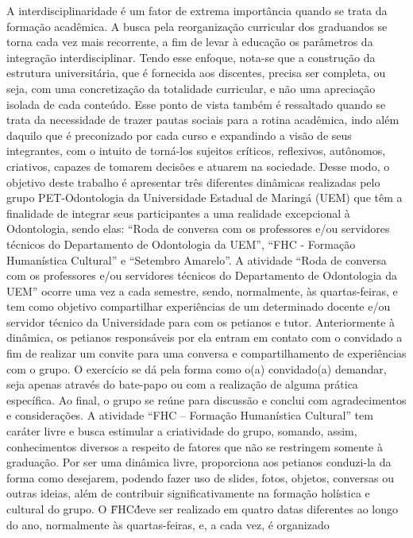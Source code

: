 A interdisciplinaridade é um fator de extrema importância quando se trata da formação acadêmica. A 
busca pela reorganização curricular dos graduandos se torna cada vez mais recorrente, a fim de levar 
à educação os parâmetros da integração interdisciplinar. Tendo esse enfoque, nota-se que a construção 
da estrutura universitária, que é fornecida aos discentes, precisa ser completa, ou seja, com uma 
concretização da totalidade curricular, e não uma apreciação isolada de cada conteúdo. Esse ponto de 
vista também é ressaltado quando se trata da necessidade de trazer pautas sociais para a rotina 
acadêmica, indo além daquilo que é preconizado por cada curso e expandindo a visão de seus 
integrantes, com o intuito de torná-los sujeitos críticos, reflexivos, autônomos, criativos, capazes de 
tomarem decisões e atuarem na sociedade. Desse modo, o objetivo deste trabalho é apresentar três 
diferentes dinâmicas realizadas pelo grupo PET-Odontologia da Universidade Estadual de Maringá 
(UEM) que têm a finalidade de integrar seus participantes a uma realidade excepcional à Odontologia, 
sendo elas: “Roda de conversa com os professores e/ou servidores técnicos do Departamento de 
Odontologia da UEM”, “FHC - Formação Humanística Cultural” e “Setembro Amarelo”.
A atividade “Roda de conversa com os professores e/ou servidores técnicos do Departamento de 
Odontologia da UEM” ocorre uma vez a cada semestre, sendo, normalmente, às quartas-feiras, e tem 
como objetivo compartilhar experiências de um determinado docente e/ou servidor técnico da 
Universidade para com os petianos e tutor. Anteriormente à dinâmica, os petianos responsáveis por 
ela entram em contato com o convidado a fim de realizar um convite para uma conversa e 
compartilhamento de experiências com o grupo. O exercício se dá pela forma como o(a) convidado(a) 
demandar, seja apenas através do bate-papo ou com a realização de alguma prática específica. Ao 
final, o grupo se reúne para discussão e conclui com agradecimentos e considerações.
A atividade “FHC – Formação Humanística Cultural” tem caráter livre e busca estimular a 
criatividade do grupo, somando, assim, conhecimentos diversos a respeito de fatores que não se 
restringem somente à graduação. Por ser uma dinâmica livre, proporciona aos petianos conduzi-la da 
forma como desejarem, podendo fazer uso de slides, fotos, objetos, conversas ou outras ideias, além 
de contribuir significativamente na formação holística e cultural do grupo. O \"FHC\'\' deve ser realizado 
em quatro datas diferentes ao longo do ano, normalmente às quartas-feiras, e, a cada vez, é organizado 
